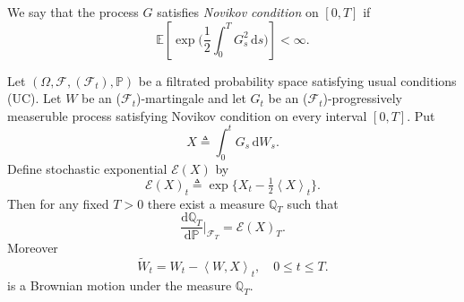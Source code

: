 \begin{appendices}
\begin{comment}
\begin{thm}[Girsanov Theorem] 
\label{Girsanov}
Let $\{\Omega,\mathcal{F},\mathbb{P}\}$ be a probability space with Brownian motion $W_t$. Let be $\{\mathcal{F}_t^{W}\}$ the filtration generated by the Brownian motion $W$. Let $(X_t,t\geq 0)$ be an $\{\mathcal{F}_t^{W}\}$-martingale with bounded trajectories.
 Define stochastic exponential $\mathcal{E}(X)$ by
\[\mathcal{E}(X)_t=\exp\{X_t-\tfrac{1}{2}\left\langle X \right\rangle_t\}.\]
Then for any fixed $T>0$ there exist a measure $\mathbb{Q}_{T}$ such that
\[\frac{\mathrm{d}\mathbb{Q}_T}{\mathrm{d}\mathbb{P}}|_{\mathcal{F}_t^{W}}=\mathcal{E}(X)_t,\quad 0\leq t\leq T.\] %
Moreover
\[\widetilde{W}_t=W_t-\left\langle W,X \right\rangle_t,\quad 0\leq t\leq T.\]
is a Brownian motion under the measure $\mathbb{Q}_T$.
\end{thm}
\end{comment}

We say that the process $G$ satisfies \textit{Novikov condition} on $[0,T]$ if
\begin{equation}
\mathbb{E}\left[\exp\Big(\frac{1}{2}\int_0^T G^2_s \,\mathrm{d}s \Big)\right]<\infty.
\end{equation}

\begin{thm} 
\label{Girsanov}
Let $(\Omega,\mathcal{F},(\mathcal{F}_t),\mathbb{P})$ be a filtrated probability space satisfying usual conditions (UC). Let $W$ be an ($\mathcal{F}_t$)-martingale and let  $G_t$ be an ($\mathcal{F}_t$)-progressively measeruble process satisfying Novikov condition on every interval $[0,T]$. Put 
\[X\triangleq\int_0^t G_s \,\mathrm{d}W_s.\]
 Define stochastic exponential $\mathcal{E}(X)$ by
\[\mathcal{E}(X)_t\triangleq\exp\{X_t-\tfrac{1}{2}\left\langle X \right\rangle_t\}.\]
Then for any fixed $T>0$ there exist a measure $\mathbb{Q}_{T}$ such that
\[\frac{\mathrm{d}\mathbb{Q}_T}{\mathrm{d}\mathbb{P}}|_{\mathcal{F}_T}=\mathcal{E}(X)_T.\] %
Moreover
\[\widetilde{W}_t=W_t-\left\langle W,X \right\rangle_t,\quad 0\leq t\leq T.\]
is a Brownian motion under the measure $\mathbb{Q}_T$.
\end{thm}

\end{appendices}

